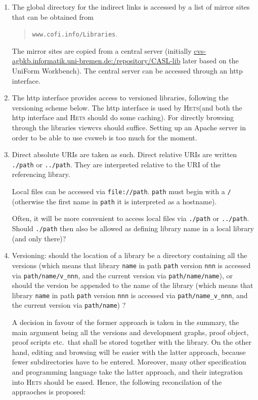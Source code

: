 \documentclass{article}
\newcommand{\Hets}{\textmd{\textsc{Hets}}\xspace }
\begin{document}
\begin{enumerate}
\item 
The global directory for the indirect links is accessed by a list of
mirror sites that can be obtained from 
\begin{quote}\texttt{www.cofi.info/Libraries}.\end{quote} 
The
mirror sites are copied from a central server (initially
\url{cvs-agbkb.informatik.uni-bremen.de:/repository/CASL-lib}
later based on the UniForm Workbench). 
The central server can be accessed through an http interface. 

\item
The http interface provides access to versioned libraries,
following the versioning scheme below.
The http interface is
used by \Hets (and both the http interface and \Hets should do some
caching). For directly browsing through the libraries viewcvs should
suffice. Setting up an Apache server in order to be able to use cvsweb
is too much for the moment.
\label{global-server}

\item 
Direct absolute URIs are taken as such. 
Direct relative URIs are written \texttt{./path}
or \texttt{../path}. They are interpreted relative to the URI
of the referencing library.

Local files can be accessed via \texttt{file://path}.
\texttt{path} must begin with a \texttt{/}
(otherwise the first name in \texttt{path} it is interpreted as a hostname).

Often, it will be more convenient to access local files
via \texttt{./path} or \texttt{../path}. Should \texttt{./path} then
also be allowed as defining library name in a local library
(and only there)?

\item 
Versioning: should the location of a library be a directory
containing all the versions (which means that library
\texttt{name} in path \texttt{path} version \texttt{nnn} is accessed via \texttt{path/name/v\_nnn},
and the current version via \texttt{path/name/name}), 
or should the version be appended to the name of the library (which
means that library \texttt{name} in path \texttt{path} version \texttt{nnn} is accessed via
\texttt{path/name\_v\_nnn}, and the current version
via \texttt{path/name}) ?

A decision in favour of the former approach is taken in the summary,
the main argument being all the versions and development graphs, proof
object, proof scripts etc.\ that shall be stored together with the
library. On the other hand, editing and browsing will be easier with
the latter approach, because fewer subdirectories have to be entered. 
Moreover, many other specification and programming
language take the latter approach, and their integration into \Hets
should be eased. Hence, the following reconcilation of the appraoches
is proposed:


\end{enumerate}
\end{document}
